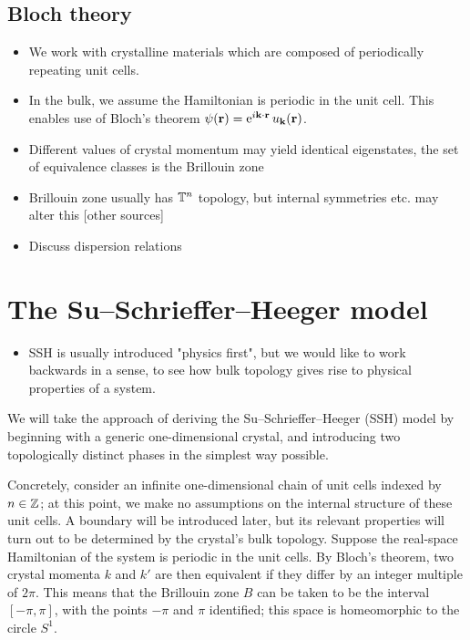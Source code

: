 \subsection{Bloch theory}
{\color{blue}
\begin{itemize}
	\item We work with crystalline materials which are composed of periodically repeating unit cells.
	
	\item In the bulk, we assume the Hamiltonian is periodic in the unit cell. This enables use of Bloch's theorem \cite{Bloch_theorem} $\psi(\vb{r}) = \operatorname{e}^{i\vb{k}\cdot\vb{r}}u_{\vb{k}}(\vb{r})$.
	
	\item Different values of crystal momentum may yield identical eigenstates, the set of equivalence classes is the Brillouin zone
	
	\item Brillouin zone usually has $\mathbb{T}^n$ topology, but internal symmetries etc. may alter this \cite{Foncesca-Vaidya_nonorientable} [other sources]
	
	\item Discuss dispersion relations
\end{itemize}
}


\section{The Su--Schrieffer--Heeger model}
{\color{blue}
	\begin{itemize}
		\item SSH is usually introduced "physics first", but we would like to work backwards in a sense, to see how bulk topology gives rise to physical properties of a system.
	\end{itemize}
}

We will take the approach of deriving the Su--Schrieffer--Heeger (SSH) model by beginning with a generic one-dimensional crystal, and introducing two topologically distinct phases in the simplest way possible.

Concretely, consider an infinite one-dimensional chain of unit cells indexed by $n\in\mathbb{Z}$; at this point, we make no assumptions on the internal structure of these unit cells. A boundary will be introduced later, but its relevant properties will turn out to be determined by the crystal's bulk topology. Suppose the real-space Hamiltonian of the system is periodic in the unit cells. By Bloch's theorem, two crystal momenta $k$ and $k'$ are then equivalent if they differ by an integer multiple of $2\pi$. This means that the Brillouin zone $B$ can be taken to be the interval $[-\pi,\pi]$, with the points $-\pi$ and $\pi$ identified; this space is homeomorphic to the circle $S^1$.

